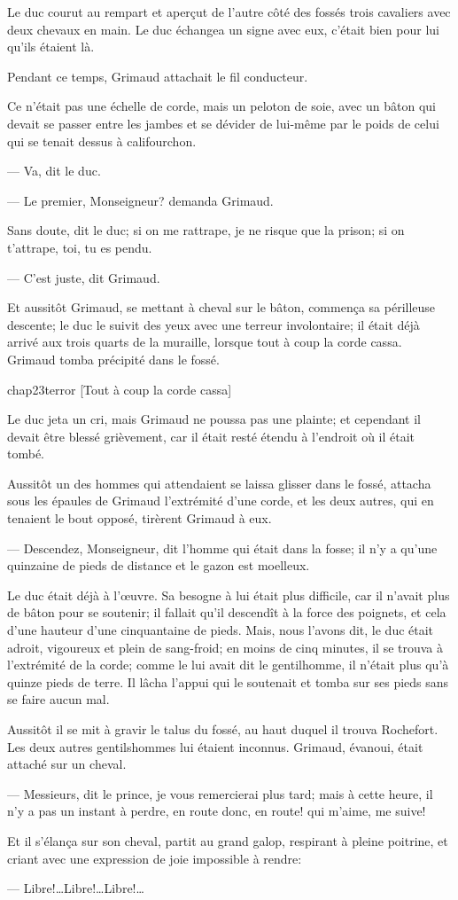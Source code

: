 Le duc courut au rempart et aperçut de l'autre côté des fossés trois cavaliers avec deux chevaux en main. Le duc échangea un signe avec eux, c'était bien pour lui qu'ils étaient là.

Pendant ce temps, Grimaud attachait le fil conducteur.

Ce n'était pas une échelle de corde, mais un peloton de soie, avec un bâton qui devait se passer entre les jambes et se dévider de lui-même par le poids de celui qui se tenait dessus à califourchon.

— Va, dit le duc.

— Le premier, Monseigneur? demanda Grimaud.

Sans doute, dit le duc; si on me rattrape, je ne risque que la prison; si on t'attrape, toi, tu es pendu.

— C'est juste, dit Grimaud.

Et aussitôt Grimaud, se mettant à cheval sur le bâton, commença sa périlleuse descente; le duc le suivit des yeux avec une terreur involontaire; il était déjà arrivé aux trois quarts de la muraille, lorsque tout à coup la corde cassa. Grimaud tomba précipité dans le fossé.

\begin{bwbigpic}
	[\basicscale] 
	{chap23terror}
	[Tout à coup la corde cassa]
\end{bwbigpic}

Le duc jeta un cri, mais Grimaud ne poussa pas une plainte; et cependant il devait être blessé grièvement, car il était resté étendu à l'endroit où il était tombé.

Aussitôt un des hommes qui attendaient se laissa glisser dans le fossé, attacha sous les épaules de Grimaud l'extrémité d'une corde, et les deux autres, qui en tenaient le bout opposé, tirèrent Grimaud à eux.

— Descendez, Monseigneur, dit l'homme qui était dans la fosse; il n'y a qu'une quinzaine de pieds de distance et le gazon est moelleux.

Le duc était déjà à l'œuvre. Sa besogne à lui était plus difficile, car il n'avait plus de bâton pour se soutenir; il fallait qu'il descendît à la force des poignets, et cela d'une hauteur d'une cinquantaine de pieds. Mais, nous l'avons dit, le duc était adroit, vigoureux et plein de sang-froid; en moins de cinq minutes, il se trouva à l'extrémité de la corde; comme le lui avait dit le gentilhomme, il n'était plus qu'à quinze pieds de terre. Il lâcha l'appui qui le soutenait et tomba sur ses pieds sans se faire aucun mal.

Aussitôt il se mit à gravir le talus du fossé, au haut duquel il trouva Rochefort. Les deux autres gentilshommes lui étaient inconnus. Grimaud, évanoui, était attaché sur un cheval.

— Messieurs, dit le prince, je vous remercierai plus tard; mais à cette heure, il n'y a pas un instant à perdre, en route donc, en route! qui m'aime, me suive!

Et il s'élança sur son cheval, partit au grand galop, respirant à pleine poitrine, et criant avec une expression de joie impossible à rendre:

— Libre!\dots Libre!\dots Libre!\dots